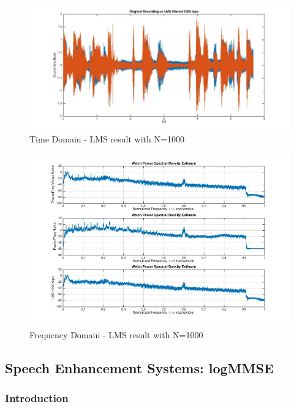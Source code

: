\documentclass[11pt,a4paper,english]{book}  %
\theoremstyle{definition}  %
\theoremstyle{plain}  %
\theoremstyle{remark}  %
\begin{document}
		\begin{figure}[h]
		\centering
		\includegraphics[width=15cm]{images/theory/lms1000tapstime.jpg}
		\caption{Time Domain - LMS result with N=1000}
		\label{fig:lmstime1000}
		\end{figure}
		
		
		\begin{figure}[h]
		\centering
		\includegraphics[width=15cm]{images/theory/lms100tapsfreq.jpg}
		\caption{Frequency Domain - LMS result with N=1000}
		\label{fig:lmsfreq1000}
		\end{figure}
		
		
	\subsection{Speech Enhancement Systems: logMMSE}
	\label{sec:enhancement}
	
	\subsubsection{Introduction}
	\label{sec:logmmseintro}
	
\end{document}
